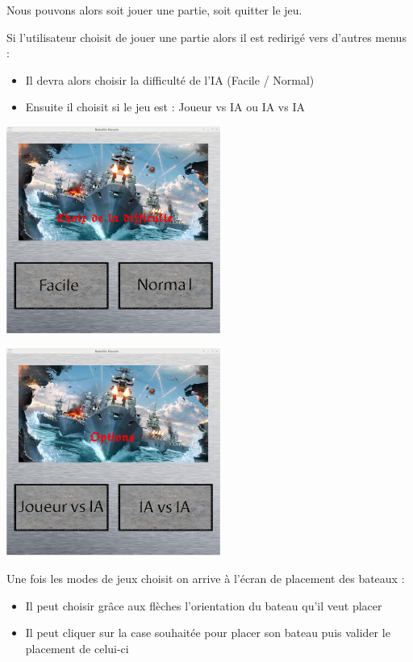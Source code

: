 \documentclass[a4paper,oneside]{article}
\begin{document}
Nous pouvons alors soit jouer une partie, soit quitter le jeu.

Si l'utilisateur choisit de jouer une partie alors il est redirigé vers d'autres menus :
\begin{itemize}
	\item Il devra alors choisir la difficulté de l'IA (Facile / Normal)
	\item Ensuite il choisit si le jeu est : Joueur vs IA ou IA vs IA
\end{itemize}

\begin{center}
	\includegraphics[width=7cm]{menuDifficulte.png} 
\end{center}

\begin{center}
	\includegraphics[width=7cm]{menuOptions.png} 
\end{center}

Une fois les modes de jeux choisit on arrive à l'écran de placement des bateaux :
\begin{itemize}
	\item Il peut choisir grâce aux flèches l'orientation du bateau qu'il veut placer
	\item Il peut cliquer sur la case souhaitée pour placer son bateau puis valider le placement de celui-ci
\end{itemize}
\end{document}
